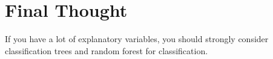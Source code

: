 \documentclass[12pt]{notes}
\begin{document}

\section{Final Thought}
If you have a lot of explanatory variables, you should strongly consider classification trees and random forest for classification. 






















\end{document}
